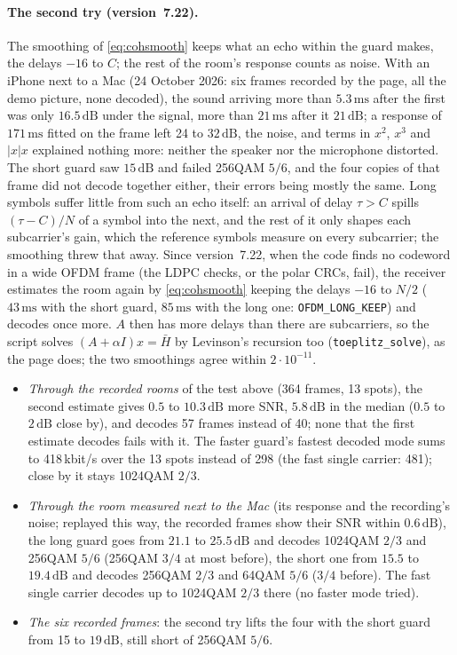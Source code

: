 \documentclass[11pt,a4paper]{article}
\newcommand{\ms}{\,\mathrm{ms}}
\newcommand{\dB}{\,\mathrm{dB}}
\newcommand{\code}[1]{\texttt{#1}}
\theoremstyle{remark}
\begin{document}
\paragraph{The second try (version~7.22).}
The smoothing of \cref{eq:cohsmooth} keeps what an echo within the guard makes, the delays $-16$ to $C$; the rest of the room's response counts as noise. With an iPhone next to a Mac (24 October 2026: six frames recorded by the page, all the demo picture, none decoded), the sound arriving more than $5.3\ms$ after the first was only $16.5\dB$ under the signal, more than $21\ms$ after it $21\dB$; a response of $171\ms$ fitted on the frame left 24 to $32\dB$, the noise, and terms in $x^2$, $x^3$ and $|x|x$ explained nothing more: neither the speaker nor the microphone distorted. The short guard saw $15\dB$ and failed 256QAM $5/6$, and the four copies of that frame did not decode together either, their errors being mostly the same. Long symbols suffer little from such an echo itself: an arrival of delay $\tau > C$ spills $(\tau - C)/N$ of a symbol into the next, and the rest of it only shapes each subcarrier's gain, which the reference symbols measure on every subcarrier; the smoothing threw that away. Since version~7.22, when the code finds no codeword in a wide OFDM frame (the LDPC checks, or the polar CRCs, fail), the receiver estimates the room again by \cref{eq:cohsmooth} keeping the delays $-16$ to $N/2$ ($43\ms$ with the short guard, $85\ms$ with the long one: \code{OFDM\_LONG\_KEEP}) and decodes once more. $A$ then has more delays than there are subcarriers, so the script solves $(A + \alpha I)x = \bar H$ by Levinson's recursion too (\code{toeplitz\_solve}), as the page does; the two smoothings agree within $2 \cdot 10^{-11}$.
\begin{itemize}
\item \emph{Through the recorded rooms} of the test above (364 frames, 13 spots), the second estimate gives $0.5$ to $10.3\dB$ more SNR, $5.8\dB$ in the median ($0.5$ to $2\dB$ close by), and decodes 57 frames instead of 40; none that the first estimate decodes fails with it. The faster guard's fastest decoded mode sums to 418\,kbit/s over the 13 spots instead of 298 (the fast single carrier: 481); close by it stays 1024QAM $2/3$.
\item \emph{Through the room measured next to the Mac} (its response and the recording's noise; replayed this way, the recorded frames show their SNR within $0.6\dB$), the long guard goes from $21.1$ to $25.5\dB$ and decodes 1024QAM $2/3$ and 256QAM $5/6$ (256QAM $3/4$ at most before), the short one from $15.5$ to $19.4\dB$ and decodes 256QAM $2/3$ and 64QAM $5/6$ ($3/4$ before). The fast single carrier decodes up to 1024QAM $2/3$ there (no faster mode tried).
\item \emph{The six recorded frames}: the second try lifts the four with the short guard from 15 to $19\dB$, still short of 256QAM $5/6$.
\end{itemize}
\end{document}
